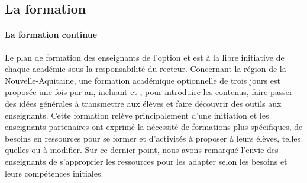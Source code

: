     \subsection{La formation}\nocite{kim2015robotics}
        \paragraph{La formation continue}
            Le plan de formation des enseignants de l'option  et   est à la libre initiative de chaque académie sous la responsabilité du recteur. Concernant la région de la Nouvelle-Aquitaine, une formation académique optionnelle de trois jours est proposée une fois par an, incluant  et , pour introduire les contenus, faire passer des idées générales à transmettre aux élèves et faire découvrir des outils aux enseignants. Cette formation relève principalement d'une initiation et les enseignants partenaires ont exprimé la nécessité de formations plus spécifiques, de besoins en ressources pour se former et d'activités à proposer à leurs élèves, telles quelles ou à modifier. Sur ce dernier point, nous avons remarqué l'envie des enseignants de s'approprier les ressources pour les adapter selon les besoins et leurs compétences initiales.
